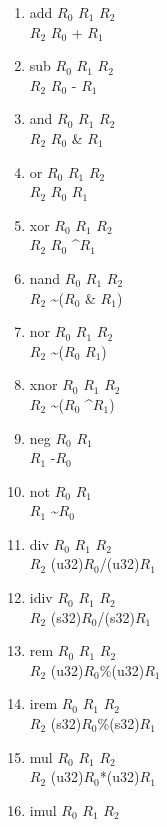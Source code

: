 \documentclass{article}
\begin{document}
	\newpage
	\small
	\begin{enumerate}
		\item add $R_0$ $R_1$ $R_2$\\
			$R_2$ \textleftarrow \space $R_0$ + $R_1$
		\item sub $R_0$ $R_1$ $R_2$\\
			$R_2$ \textleftarrow \space $R_0$ - $R_1$
		\item and $R_0$ $R_1$ $R_2$\\
			$R_2$ \textleftarrow \space $R_0$ \& $R_1$
		\item or $R_0$ $R_1$ $R_2$\\
			$R_2$ \textleftarrow \space $R_0$ \textbar \space $R_1$
		\item xor $R_0$ $R_1$ $R_2$\\
			$R_2$ \textleftarrow \space $R_0$ \textasciicircum \space $R_1$
		\item nand $R_0$ $R_1$ $R_2$\\
			$R_2$ \textleftarrow \space \textasciitilde($R_0$ \& $R_1$)
		\item nor $R_0$ $R_1$ $R_2$\\
			$R_2$ \textleftarrow \space \textasciitilde($R_0$ \textbar \space $R_1$)
		\item xnor $R_0$ $R_1$ $R_2$\\
			$R_2$ \textleftarrow \space \textasciitilde($R_0$ \textasciicircum \space $R_1$)
		\item neg $R_0$ $R_1$\\
			$R_1$ \textleftarrow \space -$R_0$
		\item not $R_0$ $R_1$\\
			$R_1$ \textleftarrow \space \textasciitilde $R_0$
		\item div $R_0$ $R_1$ $R_2$\\
			$R_2$ \textleftarrow \space (u32)$R_0$/(u32)$R_1$
		\item idiv $R_0$ $R_1$ $R_2$\\
			$R_2$ \textleftarrow \space (s32)$R_0$/(s32)$R_1$
		\item rem $R_0$ $R_1$ $R_2$\\
			$R_2$ \textleftarrow \space (u32)$R_0$\%(u32)$R_1$
		\item irem $R_0$ $R_1$ $R_2$\\
			$R_2$ \textleftarrow \space (s32)$R_0$\%(s32)$R_1$
		\item mul $R_0$ $R_1$ $R_2$\\
			$R_2$ \textleftarrow \space (u32)$R_0$*(u32)$R_1$
		\item imul $R_0$ $R_1$ $R_2$\\

\end{enumerate}
\end{document}
